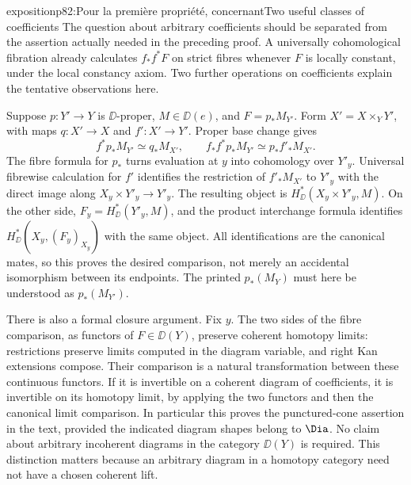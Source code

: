 \begin{dcomment}{exposition}{p82:Pour la première propriété, concernant}{Two useful classes of coefficients}
The question about arbitrary coefficients should be separated from the assertion actually needed in the preceding proof. A universally cohomological fibration already calculates $f_*f^*F$ on strict fibres whenever $F$ is locally constant, under the local constancy axiom. Two further operations on coefficients explain the tentative observations here.

Suppose $p:Y'\to Y$ is $\DD$-proper, $M\in\DD(e)$, and $F=p_*M_{Y'}$. Form $X'=X\times_Y Y'$, with maps $q:X'\to X$ and $f':X'\to Y'$. Proper base change gives
\[
 f^*p_*M_{Y'}\simeq q_*M_{X'},\qquad
 f_*f^*p_*M_{Y'}\simeq p_*f'_*M_{X'}.
\]
The fibre formula for $p_*$ turns evaluation at $y$ into cohomology over $Y'_y$. Universal fibrewise calculation for $f'$ identifies the restriction of $f'_*M_{X'}$ to $Y'_y$ with the direct image along
$X_y\times Y'_y\to Y'_y$. The resulting object is
$H^*_{\DD}(X_y\times Y'_y,M)$.
On the other side, $F_y=H^*_{\DD}(Y'_y,M)$, and the product interchange formula identifies
$H^*_{\DD}(X_y,(F_y)_{X_y})$ with the same object. All identifications are the canonical mates, so this proves the desired comparison, not merely an accidental isomorphism between its endpoints. The printed $p_*(M_Y)$ must here be understood as $p_*(M_{Y'})$.

There is also a formal closure argument. Fix $y$. The two sides of the fibre comparison, as functors of $F\in\DD(Y)$, preserve coherent homotopy limits: restrictions preserve limits computed in the diagram variable, and right Kan extensions compose. Their comparison is a natural transformation between these continuous functors. If it is invertible on a coherent diagram of coefficients, it is invertible on its homotopy limit, by applying the two functors and then the canonical limit comparison. In particular this proves the punctured-cone assertion in the text, provided the indicated diagram shapes belong to $\Dia$. No claim about arbitrary incoherent diagrams in the category $\DD(Y)$ is required. This distinction matters because an arbitrary diagram in a homotopy category need not have a chosen coherent lift.
\end{dcomment}

